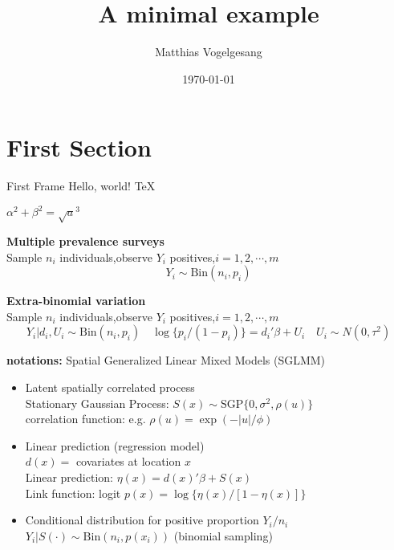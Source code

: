 \documentclass[10pt]{beamer}
\title{A minimal example}
\date{\today}
\author{Matthias Vogelgesang}
\institute{Centre for Modern Beamer Themes}
\begin{document}
\maketitle

\section{First Section}

\begin{frame}{First Frame}
Hello, world! \TeX

$\alpha^2 + \beta^2 = \sqrt{a}^3 $

\end{frame}


\begin{frame}

{\color{red} \textbf{Multiple prevalence surveys}} \\
Sample $n_{i}$ individuals,observe $Y_{i}$ positives,$i=1,2,\cdots,m$
$$Y_{i}\sim \mathrm{Bin}(n_{i},p_{i})$$

{\color{red} \textbf{Extra-binomial variation}} \\
Sample $n_{i}$ individuals,observe $Y_{i}$ positives,$i=1,2,\cdots,m$
$$Y_{i}|d_{i},U_{i}\sim \mathrm{Bin}(n_{i},p_{i}) \quad 
\log\{p_{i}/(1-p_{i})\}=d_{i}'\beta+U_{i} \quad U_{i} \sim N(0,\tau^2)$$

\textbf{notations:} Spatial Generalized Linear Mixed Models (SGLMM)
\begin{itemize}
\item Latent spatially correlated process \\
Stationary Gaussian Process: $S(x) \sim \mathrm{SGP}\{0,\sigma^2,\rho(u)\} $ \\
correlation function: e.g. $\rho(u)=\exp(-|u|/\phi)$ 
\item Linear prediction (regression model)\\
$d(x)=$ covariates at location $x$\\
Linear prediction: $\eta(x)=d(x)'\beta + S(x)$ \\
Link function: logit $p(x)=\log\{\eta(x)/[1-\eta(x)]\}$ 
\item Conditional distribution for positive proportion $Y_{i}/n_{i}$\\
$Y_{i}|S(\cdot) \sim \mathrm{Bin}(n_{i},p(x_{i}))$ (binomial sampling)
\end{itemize}

\end{frame}
\end{document}

